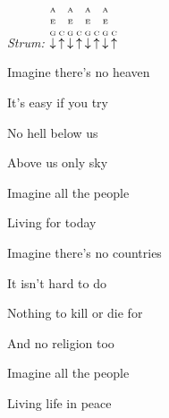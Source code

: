\begin{song}


\begin{hchordbox}
\end{hchordbox}

\bigskip
\bigskip

\begin{strumbox}
\vspace{2em}
\textit{Strum:} $\PluckDown{A \\ E \\ G}\PluckUp{C}\PluckDown{A \\ E \\ G}\PluckUp{C}\PluckDown{A \\ E \\ G}\PluckUp{C}\PluckDown{A \\ E \\ G}\PluckUp{C}$
\hspace{1em}
\end{strumbox}

\Large

 Imagine there's no heaven \par
{} It's easy if you  try  \par
{} No hell below us \par
{} Above us only  sky  \par

\bigskip

 Imagine all the people  \par
{}Living for today \par

\bigskip

 Imagine there's no countries \par
{} It isn't hard to do \par
{} Nothing to kill or die for \par
{} And no religion too \par

\bigskip

 Imagine all the people  \par
{}Living life in peace \par


\end{song}
